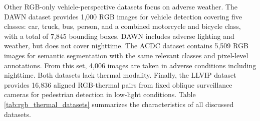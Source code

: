 \documentclass[12pt,oneside,bibtotoc,liststotoc]{scrbook}
\begin{document}
Other RGB-only vehicle-perspective datasets focus on adverse weather.
The DAWN dataset \cite{kenk2020dawn} provides 1,000 RGB images for vehicle
detection covering five classes: car, truck, bus, person, and a combined motorcycle
and bicycle class, with a total of 7,845 bounding boxes. DAWN includes adverse
lighting and weather, but does not cover nighttime. The ACDC dataset
\cite{sakaridis2025acdcDatasetAdverseConditions} contains 5,509 RGB images for
semantic segmentation with the same relevant classes and pixel-level annotations.
From this set, 4,006 images are taken in adverse conditions including nighttime.
Both datasets lack thermal modality. Finally, the LLVIP dataset \cite{jia2021llvip}
provides 16,836 aligned RGB-thermal pairs from fixed oblique surveillance cameras
for pedestrian detection in low-light conditions. Table \ref{tab:rgb_thermal_datasets}
summarizes the characteristics of all discussed datasets.
\end{document}
